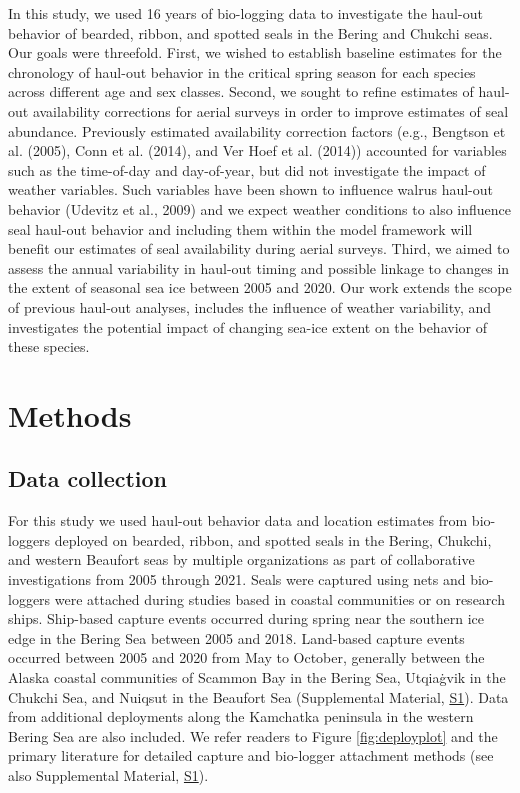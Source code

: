 \documentclass[fleqn,10pt,lineno]{wlpeerj} %
\begin{document}
In this study, we used 16 years of bio-logging data to investigate the haul-out
behavior of bearded, ribbon, and spotted seals in the Bering and Chukchi seas.
Our goals were threefold. First, we wished to establish baseline estimates for
the chronology of haul-out behavior in the critical spring season for each
species across different age and sex classes. Second, we sought to refine
estimates of haul-out availability corrections for aerial surveys in order to
improve estimates of seal abundance. Previously estimated availability
correction factors (e.g., Bengtson et al. (2005), Conn et al. (2014), and Ver Hoef et al. (2014))
accounted for variables such as the time-of-day and day-of-year, but did not
investigate the impact of weather variables. Such variables have been
shown to influence walrus haul-out behavior (Udevitz et al., 2009) and we expect weather
conditions to also influence seal haul-out behavior and including them within
the model framework will benefit our estimates of seal availability during
aerial surveys. Third, we aimed to assess the annual variability in haul-out
timing and possible linkage to changes in the extent of seasonal sea ice between
2005 and 2020. Our work extends the scope of previous haul-out analyses,
includes the influence of weather variability, and investigates the
potential impact of changing sea-ice extent on the behavior of these species.

\hypertarget{methods}{%
\section*{Methods}\label{methods}}

\hypertarget{data-collection}{%
\subsection*{Data collection}\label{data-collection}}

For this study we used haul-out behavior data and location estimates from
bio-loggers deployed on bearded, ribbon, and spotted seals in the Bering,
Chukchi, and western Beaufort seas by multiple organizations as part of
collaborative investigations from 2005 through 2021. Seals were captured using
nets and bio-loggers were attached during studies based in coastal communities
or on research ships. Ship-based capture events occurred during spring near the
southern ice edge in the Bering Sea between 2005 and 2018. Land-based capture
events occurred between 2005 and 2020 from May to October, generally between the
Alaska coastal communities of Scammon Bay in the Bering Sea, Utqiaġvik
in the Chukchi Sea, and Nuiqsut in the Beaufort Sea (Supplemental
Material, \protect\hyperlink{s1}{S1}). Data from additional
deployments along the Kamchatka peninsula in the western Bering Sea are also
included. We refer readers to Figure \ref{fig:deployplot} and the primary literature
for detailed capture and bio-logger attachment methods (see also Supplemental
Material, \protect\hyperlink{s1}{S1}).
\end{document}
